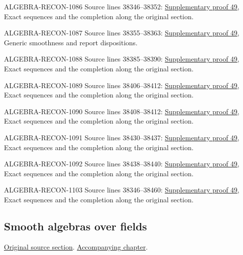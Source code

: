 \begin{AlgebraSourceRoutes}
\item[ALGEBRA-RECON-1086] Source lines 38346--38352: \hyperlink{algebra_smooth_fields_notes_20260928}{Supplementary proof 49}, Exact sequences and the completion along the original section.
\item[ALGEBRA-RECON-1087] Source lines 38355--38363: \hyperlink{algebra_smooth_fields_notes_20260928}{Supplementary proof 49}, Generic smoothness and report dispositions.
\item[ALGEBRA-RECON-1088] Source lines 38385--38390: \hyperlink{algebra_smooth_fields_notes_20260928}{Supplementary proof 49}, Exact sequences and the completion along the original section.
\item[ALGEBRA-RECON-1089] Source lines 38406--38412: \hyperlink{algebra_smooth_fields_notes_20260928}{Supplementary proof 49}, Exact sequences and the completion along the original section.
\item[ALGEBRA-RECON-1090] Source lines 38408--38412: \hyperlink{algebra_smooth_fields_notes_20260928}{Supplementary proof 49}, Exact sequences and the completion along the original section.
\item[ALGEBRA-RECON-1091] Source lines 38430--38437: \hyperlink{algebra_smooth_fields_notes_20260928}{Supplementary proof 49}, Exact sequences and the completion along the original section.
\item[ALGEBRA-RECON-1092] Source lines 38438--38440: \hyperlink{algebra_smooth_fields_notes_20260928}{Supplementary proof 49}, Exact sequences and the completion along the original section.
\item[ALGEBRA-RECON-1103] Source lines 38346--38460: \hyperlink{algebra_smooth_fields_notes_20260928}{Supplementary proof 49}, Exact sequences and the completion along the original section.
\end{AlgebraSourceRoutes}

\subsection{Smooth algebras over fields}
\hypertarget{algebra-source-section-smooth-over-field}{}
\noindent\href{https://github.com/stacks/stacks-project/blob/a04446e57ec1fbc252a871afcec7752fb2807b14/algebra.tex\#L38467}{Original source section}. \href{algebra.pdf\#nameddest=section-smooth-over-field}{Accompanying chapter}.

